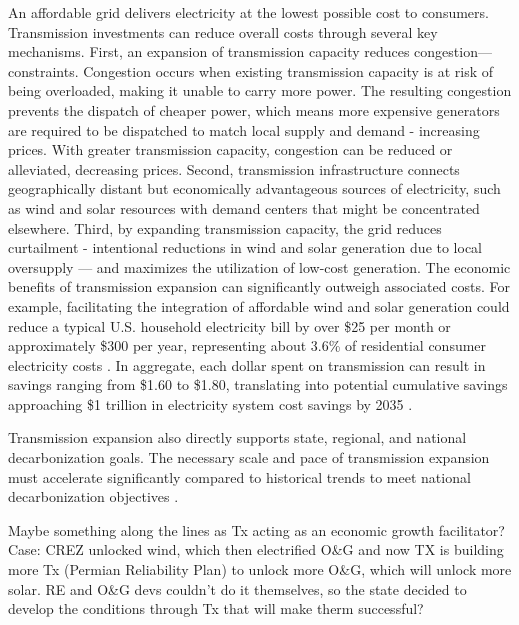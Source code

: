 \documentclass[11pt,twocolumn,a4paper]{article}
\begin{document}
An affordable grid delivers electricity at the lowest possible cost to consumers. Transmission investments can reduce overall costs through several key mechanisms. First, an expansion of transmission capacity reduces congestion—constraints. Congestion occurs when existing transmission capacity is at risk of being overloaded, making it unable to carry more power. The resulting congestion prevents the dispatch of cheaper power, which means more expensive generators are required to be dispatched to match local supply and demand - increasing prices. With greater transmission capacity, congestion can be reduced or alleviated, decreasing prices. Second, transmission infrastructure connects geographically distant but economically advantageous sources of electricity, such as wind and solar resources with demand centers that might be concentrated elsewhere. Third, by expanding transmission capacity, the grid reduces curtailment - intentional reductions in wind and solar generation  due to local oversupply — and maximizes the utilization of low-cost generation. The economic benefits of transmission expansion can significantly outweigh associated costs. For example, facilitating the integration of affordable wind and solar generation could reduce a typical U.S. household electricity bill by over \$25 per month or approximately \$300 per year, representing about 3.6\% of residential consumer electricity costs \parencite{clackConsumerEmploymentEnvironmental}. In aggregate, each dollar spent on transmission can result in savings ranging from \$1.60 to \$1.80, translating into potential cumulative savings approaching \$1 trillion in electricity system cost savings by 2035 \parencite{DOE2024NTPS}.

Transmission expansion also directly supports state, regional, and national decarbonization goals.  The necessary scale and pace of transmission expansion must accelerate significantly compared to historical trends to meet national decarbonization objectives \parencite{DOE2024NTPS}.

Maybe something along the lines as Tx acting as an economic growth facilitator? Case: CREZ unlocked wind, which then electrified O\&G and now TX is building more Tx (Permian Reliability Plan) to unlock more O\&G, which will unlock more solar. RE and O\&G devs couldn't do it themselves, so the state decided to develop the conditions through Tx that will make therm successful?

\end{document}
